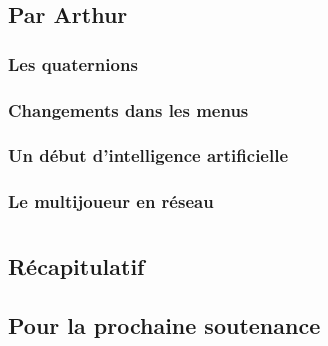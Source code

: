\documentclass{article}
\begin{document}
\subsection{Par Arthur}
\subsubsection{Les quaternions}
\subsubsection{Changements dans les menus}
\subsubsection{Un début d'intelligence artificielle}
\subsubsection{Le multijoueur en réseau}

\section{}
\subsection{Récapitulatif}
\subsection{Pour la prochaine soutenance}
\end{document}
